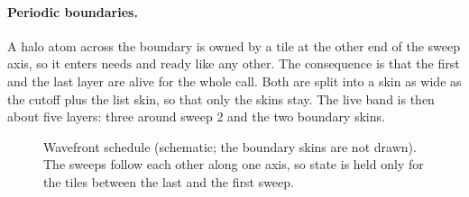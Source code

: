 \documentclass[11pt]{article}
\begin{document}
\paragraph{Periodic boundaries.}
A halo atom across the boundary is owned by a tile at the other end of the sweep axis, so it enters
$\mathrm{needs}$ and $\mathrm{ready}$ like any other. The consequence is that the first and the last layer are
alive for the whole call. Both are split into a skin as wide as the cutoff plus the list skin, so that only the
skins stay. The live band is then about five layers: three around sweep 2 and the two boundary skins.

\begin{figure}[t]
\centering
{}
\caption{Wavefront schedule (schematic; the boundary skins are not drawn). The sweeps follow each other along
one axis, so state is held only for the tiles between the last and the first sweep.}
\label{fig:wavefront}
\end{figure}
\end{document}
